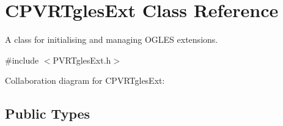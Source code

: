 \hypertarget{class_c_p_v_r_tgles_ext}{\section{C\+P\+V\+R\+Tgles\+Ext Class Reference}
\label{class_c_p_v_r_tgles_ext}
}


A class for initialising and managing O\+G\+L\+E\+S extensions.  




{\ttfamily \#include $<$P\+V\+R\+Tgles\+Ext.\+h$>$}



Collaboration diagram for C\+P\+V\+R\+Tgles\+Ext\+:
\subsection*{Public Types}
